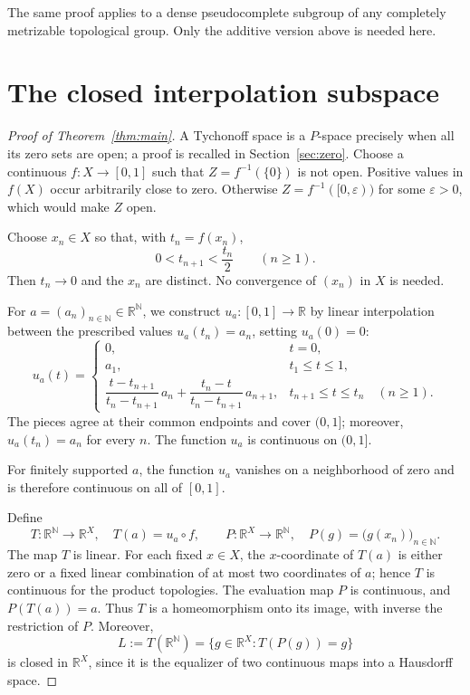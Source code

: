 \documentclass{amsart}
\theoremstyle{remark}
\newcommand{\R}{\mathbb{R}}
\newcommand{\N}{\mathbb{N}}
\begin{document}
The same proof applies to a dense pseudocomplete subgroup of any completely metrizable topological group. Only the additive version above is needed here.

\section{The closed interpolation subspace}

\begin{proof}[Proof of Theorem~\ref{thm:main}]
A Tychonoff space is a $P$-space precisely when all its zero sets are open; a proof is recalled in Section~\ref{sec:zero}. Choose a continuous $f\colon X\to[0,1]$ such that $Z=f^{-1}(\{0\})$ is not open. Positive values in $f(X)$ occur arbitrarily close to zero. Otherwise $Z=f^{-1}([0,\varepsilon))$ for some $\varepsilon>0$, which would make $Z$ open.

Choose $x_n\in X$ so that, with $t_n=f(x_n)$,
\[
0<t_{n+1}<\frac{t_n}{2} \qquad (n\geq 1).
\]
Then $t_n\to 0$ and the $x_n$ are distinct. No convergence of $(x_n)$ in $X$ is needed.

For $a=(a_n)_{n\in\N}\in\R^{\N}$, we construct $u_a\colon[0,1]\to\R$ by linear interpolation between the prescribed values $u_a(t_n)=a_n$, setting $u_a(0)=0$:
\[
u_a(t)=
\begin{cases}
0, & t=0,\\[2pt]
a_1, & t_1\leq t\leq 1,\\[4pt]
\dfrac{t-t_{n+1}}{t_n-t_{n+1}}\,a_n+\dfrac{t_n-t}{t_n-t_{n+1}}\,a_{n+1}, & t_{n+1}\leq t\leq t_n \quad (n\geq 1).
\end{cases}
\]
The pieces agree at their common endpoints and cover $(0,1]$; moreover, $u_a(t_n)=a_n$ for every $n$. The function $u_a$ is continuous on $(0,1]$.

For finitely supported $a$, the function $u_a$ vanishes on a neighborhood of zero and is therefore continuous on all of $[0,1]$.

Define
\[
T\colon\R^{\N}\to\R^X,\quad T(a)=u_a\circ f,\qquad
P\colon\R^X\to\R^{\N},\quad P(g)=\bigl(g(x_n)\bigr)_{n\in\N}.
\]
The map $T$ is linear. For each fixed $x\in X$, the $x$-coordinate of $T(a)$ is either zero or a fixed linear combination of at most two coordinates of $a$; hence $T$ is continuous for the product topologies. The evaluation map $P$ is continuous, and $P(T(a))=a$. Thus $T$ is a homeomorphism onto its image, with inverse the restriction of $P$. Moreover,
\[
L:=T(\R^{\N})=\{g\in\R^X : T(P(g))=g\}
\]
is closed in $\R^X$, since it is the equalizer of two continuous maps into a Hausdorff space.


\end{proof}
\end{document}
